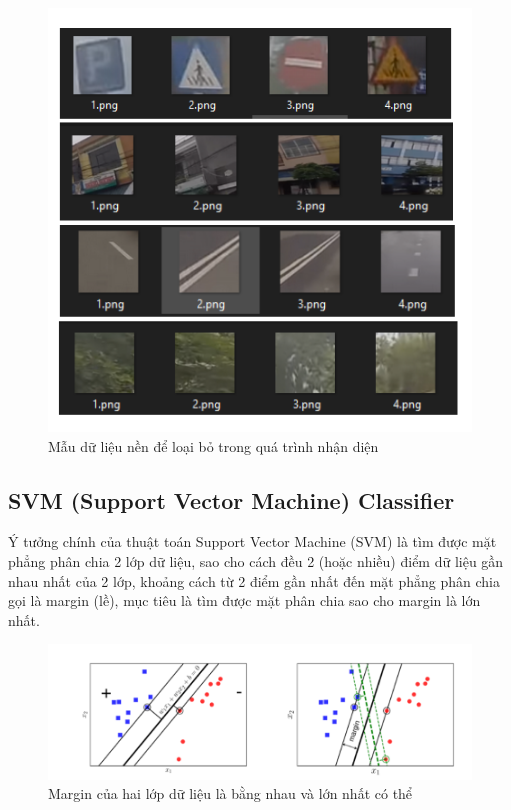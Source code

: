 \documentclass[10pt,conference,a4paper]{IEEEtran}
\makeatletter
\def\ScaleIfNeeded{\ifdim\Gin@nat@width>\linewidth\linewidth\else\Gin@nat@width\fi}
\makeatother
\begin{document}
\begin{figure}[ht]
	\includegraphics[width=\ScaleIfNeeded,height=0.8\linewidth]{data2}
	\caption{Mẫu dữ liệu nền để loại bỏ trong quá trình nhận diện}
	\label{fig:data2}
\end{figure}

\begin{figure}[ht]
	
\end{figure}

\subsection{SVM (Support Vector Machine) Classifier}
Ý tưởng chính của thuật toán Support Vector Machine (SVM) là tìm được mặt phẳng phân chia 2 lớp dữ liệu, sao cho cách đều 2 (hoặc nhiều) điểm dữ liệu gần nhau nhất của 2 lớp, khoảng cách từ 2 điểm gần nhất đến mặt phẳng phân chia gọi là margin (lề), mục tiêu là tìm được mặt phân chia sao cho margin là lớn nhất. \cite{machinelearning}

\begin{figure}[ht]
	\centering
	\includegraphics[width=\ScaleIfNeeded, height=0.6\linewidth]{svm}
	\caption{Margin của hai lớp dữ liệu là bằng nhau và lớn nhất có thể}
	\label{fig:svm}
\end{figure}
\end{document}
